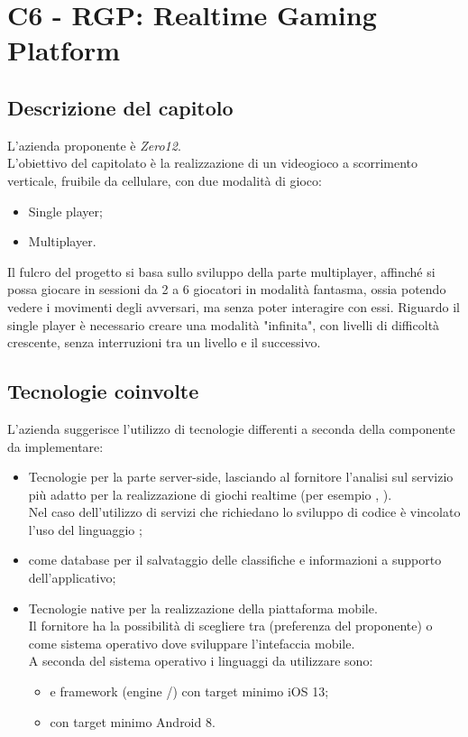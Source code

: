\section{C6 - RGP: Realtime Gaming Platform}

\subsection{Descrizione del capitolo}
L'azienda proponente è \textit{Zero12}. \\ 
L'obiettivo del capitolato è la realizzazione di un videogioco a scorrimento verticale, fruibile da cellulare, con due modalità di gioco:
\begin{itemize}
\item Single player;
\item Multiplayer.
\end{itemize}  
Il fulcro del progetto si basa sullo sviluppo della parte multiplayer, affinché si possa giocare in sessioni da 2 a 6 giocatori in modalità fantasma, ossia potendo vedere i movimenti degli avversari, ma senza poter interagire con essi.
Riguardo il single player è necessario creare una modalità "infinita", con livelli di difficoltà crescente, senza interruzioni tra un livello e il successivo.

\subsection{Tecnologie coinvolte}
L'azienda suggerisce l'utilizzo di tecnologie differenti a seconda della componente da implementare:
\begin{itemize}
\item Tecnologie  per la parte server-side, lasciando al fornitore l'analisi sul servizio più adatto per la realizzazione di giochi realtime (per esempio , ). \\
Nel caso dell'utilizzo di servizi che richiedano lo sviluppo di codice è vincolato l'uso del linguaggio ;
\item {} come database  per il salvataggio delle classifiche e informazioni a supporto dell'applicativo; 
\item Tecnologie native per la realizzazione della piattaforma mobile. \\ 
Il fornitore ha la possibilità di scegliere tra  (preferenza del proponente) o  come sistema operativo dove sviluppare l'intefaccia mobile. \\
A seconda del sistema operativo i linguaggi da utilizzare sono:
\begin{itemize}
\item {} e framework  (engine /) con target minimo iOS 13;
\item {} con target minimo Android 8.
\end{itemize}
\end{itemize}

